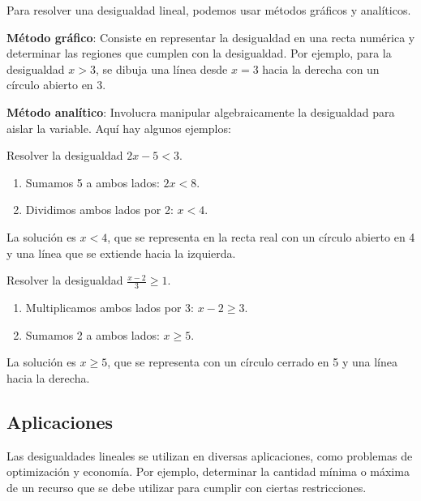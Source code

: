 Para resolver una desigualdad lineal, podemos usar métodos gráficos y analíticos.

\textbf{Método gráfico}: Consiste en representar la desigualdad en una recta numérica y determinar las regiones que cumplen con la desigualdad. Por ejemplo, para la desigualdad \(x > 3\), se dibuja una línea desde \(x = 3\) hacia la derecha con un círculo abierto en 3.

\textbf{Método analítico}: Involucra manipular algebraicamente la desigualdad para aislar la variable. Aquí hay algunos ejemplos:

\begin{example}
Resolver la desigualdad \(2x - 5 < 3\).

\begin{enumerate}
    \item Sumamos 5 a ambos lados: \(2x < 8\).
    \item Dividimos ambos lados por 2: \(x < 4\).
\end{enumerate}

La solución es \(x < 4\), que se representa en la recta real con un círculo abierto en 4 y una línea que se extiende hacia la izquierda.
\end{example}

\begin{example}
Resolver la desigualdad \(\frac{x - 2}{3} \geq 1\).

\begin{enumerate}
    \item Multiplicamos ambos lados por 3: \(x - 2 \geq 3\).
    \item Sumamos 2 a ambos lados: \(x \geq 5\).
\end{enumerate}

La solución es \(x \geq 5\), que se representa con un círculo cerrado en 5 y una línea hacia la derecha.
\end{example}

\subsection{Aplicaciones}

Las desigualdades lineales se utilizan en diversas aplicaciones, como problemas de optimización y economía. Por ejemplo, determinar la cantidad mínima o máxima de un recurso que se debe utilizar para cumplir con ciertas restricciones.
